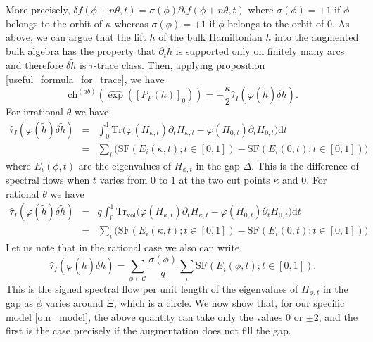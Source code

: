 \documentclass[11pt]{amsart}
\newcommand{\cut}{\kappa}
\newcommand{\chab}{\text{ch}^{(ab)}}
\newcommand{\q}{q}
\begin{document}
More precisely, $\delta f(\phi+n\theta,t) = \sigma(\phi) \partial_t f(\phi+n\theta,t)$ where $\sigma(\phi)=+1$ if $\phi$ belongs to the orbit of  $\cut$ whereas $\sigma(\phi)=+1$ if $\phi$ belongs to the orbit of $0$. As above, we can argue that the lift $\tilde h$ of the bulk Hamiltonian $h$ into the augmented bulk algebra has the property 
that $\partial_t \tilde h$ is supported only on finitely many arcs and therefore $\delta \tilde h$ is $\tau$-trace class. Then, applying proposition \ref{useful_formula_for_trace}, we have
$$\chab(\hat\exp([P_F(h)]_0))=-\frac{\cut}2 \hat\tau_I(\varphi(\tilde h)\delta \tilde h).$$
For irrational $\theta$ we have
\begin{eqnarray} \label{physical_interpr_n2_a}
	\hat\tau_I(\varphi(\tilde h)\delta \tilde h) &=&  \int_0^1 
	\mathrm{Tr}
	\big( 
	\varphi(H_{\cut,t})\partial_tH_{\cut,t}
	-
	\varphi(H_{0,t})\partial_t H_{0,t}\big) \mathrm{d}t\\
 \label{physical_interpr_n2_b}	&=& \sum_i
\big(	\mathrm{SF}(E_i(\cut,t);t\in [0,1])-\mathrm{SF}(E_i(0,t);t\in [0,1])\big)
\end{eqnarray}
where $E_i(\phi,t)$ are the eigenvalues of $H_{\phi,t}$ in the gap $\Delta$. This is the difference of spectral flows when $t$ varies from $0$ to $1$ at the two cut points $\cut$ and $0$. 
For rational $\theta$ we have
\begin{eqnarray}\nonumber
	\hat\tau_I(\varphi(\tilde h)\delta \tilde h) & = &
	q \int_0^1 
	{\mathrm{Tr}_\mathrm{vol}}
	\big( 
	\varphi(H_{\cut,t})\partial_tH_{\cut,t}
	-
	\varphi(H_{0,t})\partial_t H_{0,t}\big) 
	\mathrm{d}t \\
 \label{physical_interpr_n2_c}	&=& \sum_i
\big(	\mathrm{SF}(E_i(\cut,t);t\in [0,1])-\mathrm{SF}(E_i(0,t);t\in [0,1])\big)
	\end{eqnarray}
Let us note that in the rational case we also can write 
$$\hat\tau_I(\varphi(\tilde h)\delta \tilde h) =	\sum_{\phi\in\mathcal C} \frac{\sigma(\phi)}{\q}  \sum_i
	\mathrm{SF}(E_i(\phi,t);t\in [0,1]).$$ 
	This is the signed spectral flow per unit length of the eigenvalues of $H_{\phi,t}$ in the gap as $\tilde\phi$ varies around $\tilde\Xi$, which is a circle.
We now show that, for our specific model \eqref{our_model}, the above quantity can take only the values $0$ or $\pm 2$, and the first is the case precisely if the augmentation does not fill the gap.
\end{document}
